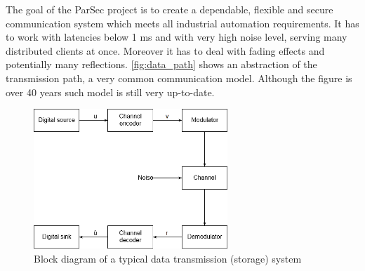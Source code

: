 \documentclass[]{myclass}
\begin{document}
The goal of the ParSec project is to create a dependable, flexible and secure communication system which meets all industrial automation requirements. It has to work with latencies below 1 ms and with very high noise level, serving many distributed clients at once. Moreover it has to deal with fading effects and potentially many reflections. \autoref{fig:data_path} shows an abstraction of the transmission path, a very common communication model. Although the figure is over 40 years such model is still very up-to-date.
\begin  {figure} [htb]
\centering
\includegraphics[width=0.65\textwidth]{figures/Data_transmission_path.png}
\caption{Block diagram of a typical data transmission (storage) system~\cite{book:LinCostello}}
\label{fig:data_path}
\end {figure}
\end{document}
